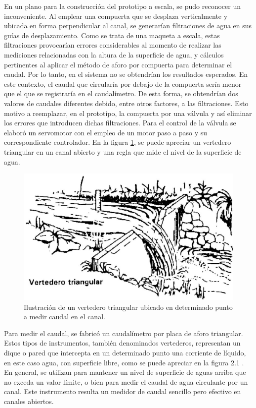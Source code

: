 En un plano para la construcción del prototipo a escala, se pudo reconocer un inconveniente. Al emplear una compuerta que se desplaza verticalmente y ubicada en forma perpendicular al canal, se generarían filtraciones de agua en sus guías de desplazamiento. Como se trata de una maqueta a escala, estas filtraciones provocarían errores considerables al momento de realizar las mediciones relacionadas con la altura de la superficie de agua, y cálculos pertinentes al aplicar el método de aforo por compuerta para determinar el caudal. Por lo tanto, en el sistema no se obtendrían los resultados esperados. En este contexto, el caudal que circularía por debajo de la compuerta sería menor que el que se registraría en el caudalímetro. De esta forma, se obtendrían dos valores de caudales diferentes debido, entre otros factores, a las filtraciones.     
Esto motivo a reemplazar, en el prototipo, la compuerta por una válvula y así eliminar los errores que introducen dichas filtraciones. 
Para el control de la válvula se elaboró un servomotor con el empleo de un motor paso a paso y su correspondiente controlador.
En la figura \ref{fig:Vertedero triangular}, se puede apreciar un vertedero triangular en un canal abierto y una regla que mide el nivel de la superficie de agua.
\begin{figure}[h]
\centering
\includegraphics[scale=.60]{./Figures/VertederoTriangular.png}
\caption{Ilustración de un vertedero triangular ubicado en determinado punto a medir caudal en el canal.}
\label{fig:Vertedero triangular}
\end{figure}

Para medir el caudal, se fabricó un caudalímetro por placa de aforo triangular. Estos tipos de instrumentos, también denominados vertederos, representan un dique o pared que intercepta en un determinado punto una corriente de líquido, en este caso agua, con superficie libre, como se puede apreciar en la figura 2.1 . En general, se utilizan para mantener un nivel de superficie de aguas arriba que no exceda un valor límite, o bien para medir el caudal de agua circulante por un canal. Este instrumento resulta un medidor de caudal sencillo pero efectivo en canales abiertos. 

